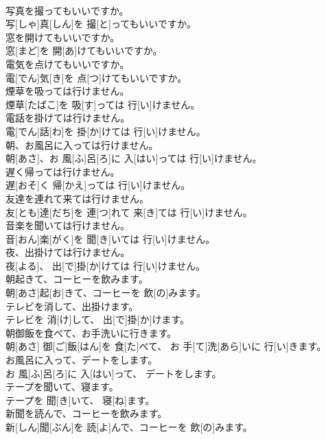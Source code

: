 \documentclass[8pt]{extreport}
\begin{document}
\begin{CJK}{UTF8}{min}
\\	写真を撮ってもいいですか。	
\\	写[しゃ]真[しん]を 撮[と]ってもいいですか。
\\	窓を開けてもいいですか。	
\\	窓[まど]を 開[あ]けてもいいですか。
\\	電気を点けてもいいですか。	
\\	電[でん]気[き]を 点[つ]けてもいいですか。
\\	煙草を吸っては行けません。	
\\	煙草[たばこ]を 吸[す]っては 行[い]けません。
\\	電話を掛けては行けません。	
\\	電[でん]話[わ]を 掛[か]けては 行[い]けません。
\\	朝、お風呂に入っては行けません。	
\\	朝[あさ]、お 風[ふ]呂[ろ]に 入[はい]っては 行[い]けません。
\\	遅く帰っては行けません。	
\\	遅[おそ]く 帰[かえ]っては 行[い]けません。
\\	友達を連れて来ては行けません。	
\\	友[とも]達[だち]を 連[つ]れて 来[き]ては 行[い]けません。
\\	音楽を聞いては行けません。	
\\	音[おん]楽[がく]を 聞[き]いては 行[い]けません。
\\	夜、出掛けては行けません。	
\\	夜[よる]、 出[で]掛[か]けては 行[い]けません。
\\	朝起きて、コーヒーを飲みます。	
\\	朝[あさ]起[お]きて、コーヒーを 飲[の]みます。
\\	テレビを消して、出掛けます。	
\\	テレビを 消[け]して、 出[で]掛[か]けます。
\\	朝御飯を食べて、お手洗いに行きます。	
\\	朝[あさ] 御[ご]飯[はん]を 食[た]べて、 お 手[て]洗[あら]いに 行[い]きます。
\\	お風呂に入って、デートをします。	
\\	お 風[ふ]呂[ろ]に 入[はい]って、 デートをします。
\\	テープを聞いて、寝ます。	
\\	テープを 聞[き]いて、 寝[ね]ます。
\\	新聞を読んで、コーヒーを飲みます。	
\\	新[しん]聞[ぶん]を 読[よ]んで、コーヒーを 飲[の]みます。

\end{CJK}
\end{document}
